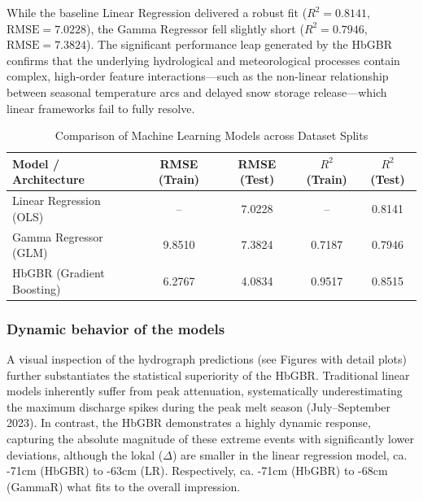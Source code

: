 \documentclass[a4paper,12pt]{article}
\begin{document}
While the baseline Linear Regression delivered a robust fit ($R^2 = 0.8141$, $\text{RMSE} = 7.0228$), 
the Gamma Regressor fell slightly short ($R^2 = 0.7946$, $\text{RMSE} = 7.3824$). 
The significant performance leap generated by the HbGBR confirms that the underlying 
hydrological and meteorological processes contain complex, high-order feature 
interactions—such as the non-linear relationship between seasonal temperature arcs 
and delayed snow storage release—which linear frameworks fail to fully resolve.

\begin{table}[H]
    \centering
    \caption{Comparison of Machine Learning Models across Dataset Splits}
    \label{tab:ml_model_comparison}
    \begin{tabular}{lcccc}
        \hline
        \textbf{Model / Architecture} & \textbf{RMSE (Train)} & \textbf{RMSE (Test)} & \textbf{\(R^2\) (Train)} & \textbf{\(R^2\) (Test)} \\ \hline
        Linear Regression (OLS)       & --                    & 7.0228               & --                       & 0.8141                  \\
        Gamma Regressor (GLM)         & 9.8510                & 7.3824               & 0.7187                   & 0.7946                  \\
        HbGBR (Gradient Boosting)     & 6.2767                & 4.0834               & 0.9517                   & 0.8515                  \\ \hline
    \end{tabular}
\end{table}

\subsubsection{Dynamic behavior of the models}

A visual inspection of the hydrograph predictions (see Figures with detail plots) 
further substantiates the statistical superiority of the HbGBR. Traditional linear 
models inherently suffer from peak attenuation, systematically underestimating the 
maximum discharge spikes during the peak melt season (July--September 2023). 
In contrast, the HbGBR demonstrates a highly dynamic response, capturing the absolute 
magnitude of these extreme events with significantly lower deviations, although the lokal ($\Delta$) are smaller in the linear regression model, ca. -71cm (HbGBR) to -63cm (LR). Respectively, ca. -71cm (HbGBR) to -68cm (GammaR) what fits to the overall impression.
\end{document}
